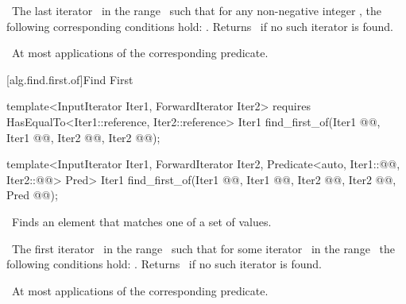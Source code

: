 \documentclass[american,twoside]{book}
\begin{document}
\begin{paras}
\begin{itemdescr}
\pnum
\textcolor{black}{}\returns\ 
The last iterator
\
in the range \
such that for any non-negative integer
,
the following corresponding conditions hold:
.
Returns \farg{last1}\
if no such iterator is found.

\pnum
\complexity\ 
At most
applications of the corresponding predicate.
\end{itemdescr}

\rSec2[alg.find.first.of]{Find First}


%
\color{addclr}\begin{itemdecl}
template<InputIterator Iter1, ForwardIterator Iter2>
  requires HasEqualTo<Iter1::reference, Iter2::reference>
  Iter1 find_first_of(Iter1 @@, Iter1 @@,
                      Iter2 @@, Iter2 @@);

template<InputIterator Iter1, ForwardIterator Iter2,
         Predicate<auto, Iter1::@@, Iter2::@@> Pred>
  Iter1 find_first_of(Iter1 @\farg{first1}@, Iter1 @\farg{last1}@,
                      Iter2 @\farg{first2}@, Iter2 @\farg{last2}@,
                      Pred @@);
\end{itemdecl}\color{black}

\begin{itemdescr}
\pnum
\effects\ 
Finds an element that matches one of a set of values.

\pnum
\returns\ 
The first iterator
\
in the range \
such that for some
iterator
\tcode{j}\
in the range \
the following conditions hold:
.
Returns \
if no such iterator is found.

\pnum
\complexity\ 
At most
applications of the corresponding predicate.
\end{itemdescr}


\end{paras}
\end{document}
